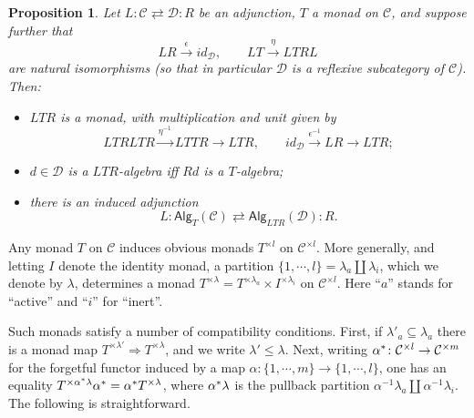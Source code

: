 \documentclass[a4paper,10pt
,draft
]{article}%
\numberwithin{equation}{section}
\numberwithin{figure}{section}
\newtheorem{proposition}[equation]{Proposition}%
\theoremstyle{definition} %
\newcommand{\C}{\ensuremath{\mathcal C}}
\newcommand{\1}{\ensuremath{\mathbbm 1}}%
\begin{document}
\begin{proposition}\label{MONADADJ PROP}
Let
$
L \colon \mathcal{C} \rightleftarrows \mathcal{D} \colon R
$
be an adjunction, $T$ a monad on $\mathcal{C}$, and suppose further that
\[
	LR \xrightarrow{\epsilon} id_{\mathcal{D}}, 
\qquad
	LT \xrightarrow{\eta} LTRL
\]
are natural isomorphisms 
(so that in particular $\mathcal{D}$ is a reflexive subcategory of $\mathcal{C}$).
Then:
\begin{itemize}
\item[(i)] $LTR$ is a monad, with multiplication and unit given by
\[LTRLTR \xrightarrow{\eta^{-1}} LTTR \to LTR,\qquad
id_{\mathcal{D}} \xrightarrow{\epsilon^{-1}} LR \to LTR;
\]
\item[(ii)]
$d \in \mathcal{D}$ is a $LTR$-algebra iff $Rd$ is a $T$-algebra;
\item[(iii)] there is an induced adjunction
\[
L \colon \mathsf{Alg}_{T}(\mathcal{C})
	\rightleftarrows
\mathsf{Alg}_{LTR}(\mathcal{D}) \colon R.
\]
\end{itemize}
\end{proposition}


Any monad $T$ on $\C$ induces obvious monads $T^{\times l}$ on $\C^{\times l}$.
More generally, and 
letting $I$ denote the identity monad,
a partition 
$\{1,\cdots,l\} = \lambda_a \amalg \lambda_i$,
which we denote by $\lambda$,
determines a monad 
$T^{\times \lambda} = T^{\times \lambda_a} \times I^{\times \lambda_i}$ on $\mathcal{C}^{\times l}$.
Here ``$a$'' stands for ``active'' and ``$i$'' for ``inert''.


Such monads satisfy a number of compatibility conditions. 
First, if $\lambda'_a \subseteq \lambda_a$
there is a monad map
$T^{\times \lambda'} \Rightarrow T^{\times \lambda}$,
and we write $\lambda' \leq \lambda$.
Next, writing $\alpha^{\**} \colon 
\C^{\times l} \to \C^{\times m}$
for the forgetful functor induced by
a map $\alpha \colon \{1,\cdots,m\} \to \{1,\cdots,l\}$,
one has an equality
$T^{\times \alpha^{\**}\lambda} \alpha^{\**} =
\alpha^{\**} T^{\times \lambda}$,
where $\alpha^{\**}\lambda$ is the pullback partition
$\alpha^{-1} \lambda_a \amalg \alpha^{-1} \lambda_i$.
The following is straightforward.
\end{document}
